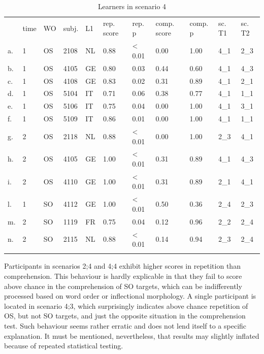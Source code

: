 \begin{table}
    \begin{tabularx}{\textwidth}{XXXXXXXXXXX} & time & WO & subj. & L1 & rep. score & rep. p & comp. score & comp. p & sc. T1 & sc. T2\\
    \lsptoprule
    a. & 1 & OS & 2108 & NL & 0.88 & < 0.01 & 0.00 & 1.00 & 4\_1 & 2\_3\\
    b. & 1 & OS & 4105 & GE & 0.80 & 0.03 & 0.44 & 0.60 & 4\_1 & 4\_3\\
    c. & 1 & OS & 4108 & GE & 0.83 & 0.02 & 0.31 & 0.89 & 4\_1 & 2\_1\\
    d. & 1 & OS & 5104 & IT & 0.71 & 0.06 & 0.38 & 0.77 & 4\_1 & 1\_1\\
    e. & 1 & OS & 5106 & IT & 0.75 & 0.04 & 0.00 & 1.00 & 4\_1 & 3\_1\\
    f. & 1 & OS & 5109 & IT & 0.86 & 0.01 & 0.00 & 1.00 & 4\_1 & 1\_1\\
    g. & 2 & OS & 2118 & NL & 0.88 & < 0.01 & 0.00 & 1.00 & 2\_3 & 4\_1\\
    h. & 2 & OS & 4105 & GE & 1.00 & < 0.01 & 0.31 & 0.89 & 4\_1 & 4\_3\\
    i. & 2 & OS & 4110 & GE & 1.00 & < 0.01 & 0.31 & 0.89 & 2\_1 & 4\_1\\
    l. & 1 & SO & 4112 & GE & 1.00 & < 0.01 & 0.50 & 0.36 & 2\_4 & 2\_3\\
    m. & 2 & SO & 1119 & FR & 0.75 & 0.04 & 0.12 & 0.96 & 2\_2 & 2\_4\\
    n. & 2 & SO & 2115 & NL & 0.88 & < 0.01 & 0.14 & 0.94 & 2\_3 & 2\_4\\
    \lspbottomrule
    \end{tabularx}
    \caption{Learners in scenario 4}
    \label{tab:06:9}
\end{table}

Participants in scenarios 2;4 and 4;4 exhibit higher scores in repetition than comprehension. This behaviour is hardly explicable in that they fail to score above chance in the comprehension of SO targets, which can be indifferently processed based on word order or inflectional morphology. A single participant is located in scenario 4;3, which surprisingly indicates above chance repetition of OS, but not SO targets, and just the opposite situation in the comprehension test. Such behaviour seems rather erratic and does not lend itself to a specific explanation. It must be mentioned, nevertheless, that results may slightly inflated because of repeated statistical testing. 


